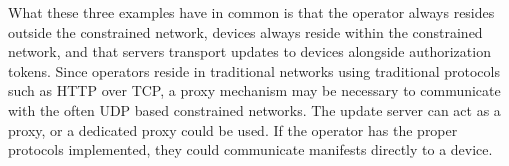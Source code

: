 \documentclass[0-thesis.tex]{subfiles}
\begin{document}
What these three examples have in common is that the operator always resides outside the
constrained network, devices always reside within the constrained network, and that
servers transport updates to devices alongside authorization tokens. Since operators
reside in traditional networks using traditional protocols such as HTTP over TCP, a proxy
mechanism may be necessary to communicate with the often UDP based constrained networks.
The update server can act as a proxy, or a dedicated proxy could be used. If the operator
has the proper protocols implemented, they could communicate manifests directly to a
device.
\end{document}
